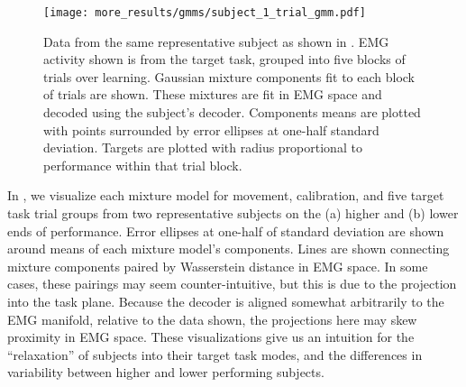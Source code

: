 \documentclass[../main.tex]{subfiles}
\begin{document}
\begin{figure}[!htb]
  \centering
    \texttt{[image: more\_results/gmms/subject\_1\_trial\_gmm.pdf]}
    \caption[Subject trial data overlaid on Gaussian mixture]{Data from the same representative subject as shown in . EMG activity shown is from the target task, grouped into five blocks of trials over learning. Gaussian mixture components fit to each block of trials are shown. These mixtures are fit in EMG space and decoded using the subject's decoder. Components means are plotted with points surrounded by error ellipses at one-half standard deviation. Targets are plotted with radius proportional to performance within that trial block.}\label{fig:example_1_trial_data_gmms}
\end{figure}




In , we visualize each mixture model for movement, calibration, and five target task trial groups from two representative subjects on the (a) higher and (b) lower ends of performance. Error ellipses at one-half of standard deviation are shown around means of each mixture model's components. Lines are shown connecting mixture components paired by Wasserstein distance in EMG space. In some cases, these pairings may seem counter-intuitive, but this is due to the projection into the task plane. Because the decoder is aligned somewhat arbitrarily to the EMG manifold, relative to the data shown, the projections here may skew proximity in EMG space. These visualizations give us an intuition for the ``relaxation'' of subjects into their target task modes, and the differences in variability between higher and lower performing subjects.
\end{document}
